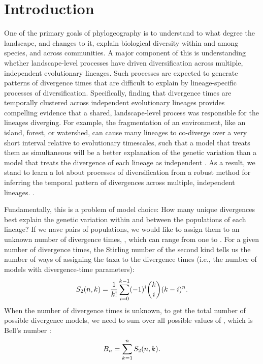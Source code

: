 
\section{Introduction}

One of the primary goals of phylogeography is to understand to what degree the
landscape, and changes to it, explain biological diversity within and among
species, and across communities.
A major component of this is understanding whether landscape-level processes
have driven diversification across multiple, independent evolutionary lineages.
Such processes are expected to generate patterns of divergence times
that are difficult to explain by lineage-specific processes of 
diversification.
Specifically, finding that divergence times are temporally clustered across
independent evolutionary lineages provides compelling evidence that a shared,
landscape-level process was responsible for the lineages diverging.
For example, the fragmentation of an environment, like an island, forest, or
watershed, can cause many lineages to co-diverge over a very short interval
relative to evolutionary timescales, such that a model that treats them as
simultaneous will be a better explanation of the genetic variation than a model
that treats the divergence of each lineage as independent \figureNeeded.
As a result, we stand to learn a lot about processes of diversification from a
robust method for inferring the temporal pattern of divergences across
multiple, independent lineages.
.

\begin{linenomath}
Fundamentally, this is a problem of model choice:
How many unique divergences best explain the genetic variation within and
between the populations of each lineage?
If we nave \ncomparisons pairs of populations, we would like to assign them to an
unknown number of divergence times, \nevents, which can range from one to
\ncomparisons.
For a given number of divergence times, the Stirling number of the second kind
tells us the number of ways of assigning the taxa to the divergence times
(i.e., the number of models with \nevents divergence-time parameters):
\begin{equation}
    S_2(n, k_{}) = 
    \frac{1}{k_{}!} \sum_{i = 0}^{k_{} - 1} (-1)^{i}
    \binom{k_{}}{i} (k_{} - i)^{n}.
    \label{eq:stirling2}
\end{equation}
When the number of divergence times is unknown, to get the total
number of possible divergence models, we need to sum over
all possible values of \nevents, which is Bell's number \citep{Bell1934}:
\begin{equation}
    B_{n} = \sum_{k_{} = 1}^{n}
    S_2(n, k_{}).
    \label{eq:bell}
\end{equation}
\end{linenomath}

